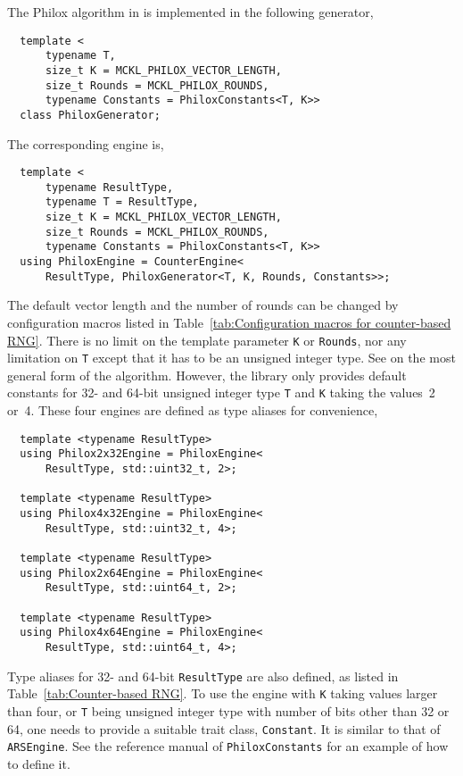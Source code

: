 The Philox algorithm in \cite{Salmon:2011um} is implemented in the following
generator,
\begin{Verbatim}
  template <
      typename T,
      size_t K = MCKL_PHILOX_VECTOR_LENGTH,
      size_t Rounds = MCKL_PHILOX_ROUNDS,
      typename Constants = PhiloxConstants<T, K>>
  class PhiloxGenerator;
\end{Verbatim}
The corresponding \rng engine is,
\begin{Verbatim}
  template <
      typename ResultType,
      typename T = ResultType,
      size_t K = MCKL_PHILOX_VECTOR_LENGTH,
      size_t Rounds = MCKL_PHILOX_ROUNDS,
      typename Constants = PhiloxConstants<T, K>>
  using PhiloxEngine = CounterEngine<
      ResultType, PhiloxGenerator<T, K, Rounds, Constants>>;
\end{Verbatim}
The default vector length and the number of rounds can be changed by
configuration macros listed in Table~\ref{tab:Configuration macros for
  counter-based RNG}. There is no limit on the template parameter \verb|K| or
\verb|Rounds|, nor any limitation on \verb|T| except that it has to be an
unsigned integer type. See \cite{Salmon:2011um} on the most general form of the
algorithm. However, the library only provides default constants for 32- and
64-bit unsigned integer type \verb|T| and \verb|K| taking the values~2 or~4.
These four engines are defined as type aliases for convenience,
\begin{Verbatim}
  template <typename ResultType>
  using Philox2x32Engine = PhiloxEngine<
      ResultType, std::uint32_t, 2>;

  template <typename ResultType>
  using Philox4x32Engine = PhiloxEngine<
      ResultType, std::uint32_t, 4>;

  template <typename ResultType>
  using Philox2x64Engine = PhiloxEngine<
      ResultType, std::uint64_t, 2>;

  template <typename ResultType>
  using Philox4x64Engine = PhiloxEngine<
      ResultType, std::uint64_t, 4>;
\end{Verbatim}
Type aliases for 32- and 64-bit \verb|ResultType| are also defined, as listed
in Table~\ref{tab:Counter-based RNG}. To use the engine with \verb|K| taking
values larger than four, or \verb|T| being unsigned integer type with number of
bits other than 32 or 64, one needs to provide a suitable trait class,
\verb|Constant|. It is similar to that of \verb|ARSEngine|. See the reference
manual of \verb|PhiloxConstants| for an example of how to define it.

